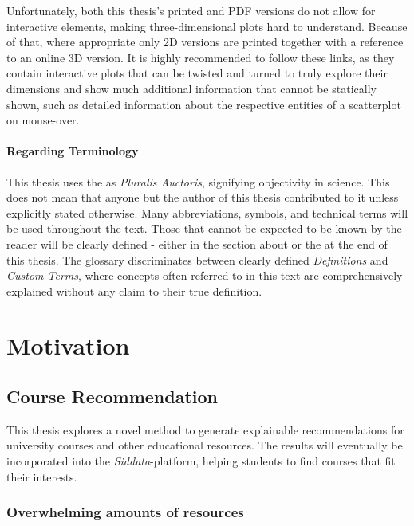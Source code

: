 Unfortunately, both this thesis's printed and PDF versions do not allow for interactive elements, making three-dimensional plots hard to understand. Because of that, where appropriate only 2D versions are printed together with a reference to an online 3D version. It is highly recommended to follow these links, as they contain interactive plots that can be twisted and turned to truly explore their dimensions and show much additional information that cannot be statically shown, such as detailed information about the respective entities of a scatterplot on mouse-over.

\paragraph*{Regarding Terminology}

This thesis uses the  as \emph{Pluralis Auctoris}, signifying objectivity in science. This does not mean that anyone but the author of this thesis contributed to it unless explicitly stated otherwise. Many abbreviations, symbols, and technical terms will be used throughout the text. Those that cannot be expected to be known by the reader will be clearly defined - either in the section about  or the  at the end of this thesis. The glossary discriminates between clearly defined \textit{Definitions} and \textit{Custom Terms}, where concepts often referred to in this text are comprehensively explained without any claim to their true definition. 

\section{Motivation}

\subsection{Course Recommendation}

This thesis explores a novel method to generate explainable recommendations for university courses and other educational resources. The results will eventually be incorporated into the \emph{Siddata}-platform, helping students to find courses that fit their interests.

\subsubsection*{Overwhelming amounts of resources}
\label{sec:many_resources}

